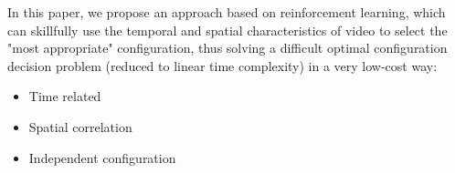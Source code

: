 In this paper, we propose an approach based on reinforcement learning, which can skillfully use the temporal and spatial characteristics of video to select the "most appropriate" configuration, thus solving a difficult optimal configuration decision problem (reduced to linear time complexity) in a very low-cost way:

\begin{itemize}
\item Time related
\item Spatial correlation
\item Independent configuration
\end{itemize}